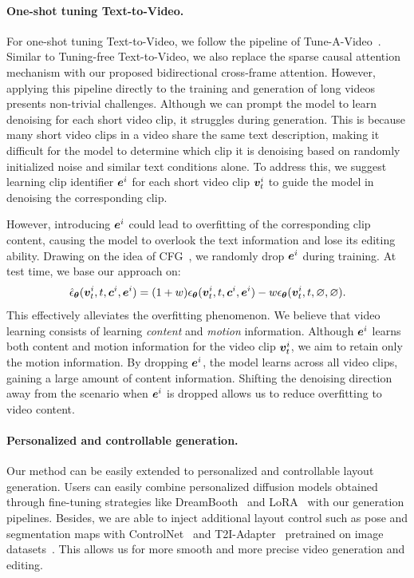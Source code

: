 \documentclass{article}
\begin{document}
\paragraph{One-shot tuning Text-to-Video.}\label{sec:osttv}
For one-shot tuning Text-to-Video, we follow the pipeline of Tune-A-Video~\cite{wu2022tune}. Similar to Tuning-free Text-to-Video, we also replace the sparse causal attention mechanism with our proposed bidirectional cross-frame attention. However, applying this pipeline directly to the training and generation of long videos presents non-trivial challenges. Although we can prompt the model to learn denoising for each short video clip, it struggles during generation. This is because many short video clips in a video share the same text description, making it difficult for the model to determine which clip it is denoising based on randomly initialized noise and similar text conditions alone. To address this, we suggest learning clip identifier ${\bm{e}}^i$ for each short video clip ${\bm{v}}_{t}^i$ to guide the model in denoising the corresponding clip.

However, introducing ${\bm{e}}^i$ could lead to overfitting of the corresponding clip content, causing the model to overlook the text information and lose its editing ability. Drawing on the idea of CFG~\cite{ho2021classifier}, we randomly drop ${\bm{e}}^i$ during training. At test time, we base our approach on:
$$
\hat{\epsilon}_{\bm{\theta}}({\bm{v}}^i_{t},t,{\bm{c}}^i,{\bm{e}}^i) = (1+w)  \epsilon_{\bm{\theta}}({\bm{v}}^i_{t},t,{\bm{c}}^i,{\bm{e}}^i) - w \epsilon_{\bm{\theta}}({\bm{v}}^i_{t},t,\varnothing,\varnothing).
$$
This effectively alleviates the overfitting phenomenon. We believe that video learning consists of learning \textit{content} and \textit{motion} information. Although ${\bm{e}}^i$ learns both content and motion information for the video clip ${\bm{v}}_{t}^i$, we aim to retain only the motion information. By dropping ${\bm{e}}^i$, the model learns across all video clips, gaining a large amount of content information. Shifting the denoising direction away from the scenario when ${\bm{e}}^i$ is dropped allows us to reduce overfitting to video content.
\paragraph{Personalized and controllable generation.}
Our method can be easily extended to personalized and controllable layout generation. Users can easily combine personalized diffusion models obtained through fine-tuning strategies like DreamBooth~\cite{ruiz2022dreambooth} and LoRA~\cite{hu2021lora} with our generation pipelines. Besides, we are able to inject additional layout control such as pose and segmentation maps with ControlNet~\cite{zhang2023adding} and T2I-Adapter~\cite{mou2023t2i,ma2023follow} pretrained on image datasets~\cite{laion5b}.  This allows us for more smooth and more precise video generation and editing.
\end{document}
